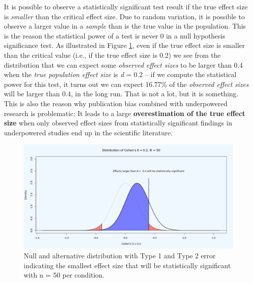 \documentclass[
  oneside]{book}
\begin{document}
It is possible to observe a statistically significant test result if the true effect size is \emph{smaller} than the critical effect size. Due to random variation, it is possible to observe a larger value in a \emph{sample} than is the true value in the population. This is the reason the statistical power of a test is never 0 in a null hypothesis significance test. As illustrated in Figure \ref{fig:distpowerplot2}, even if the true effect size is smaller than the critical value (i.e., if the true effect size is 0.2) we see from the distribution that we can expect some \emph{observed effect sizes} to be larger than 0.4 when the \emph{true population effect size} is \emph{d} = 0.2 -- if we compute the statistical power for this test, it turns out we can expect 16.77\% of the \emph{observed effect sizes} will be larger than 0.4, in the long run. That is not a lot, but it is something. This is also the reason why publication bias combined with underpowered research is problematic: It leads to a large \textbf{overestimation of the true effect size} when only observed effect sizes from statistically significant findings in underpowered studies end up in the scientific literature.



\begin{figure}

{\centering \includegraphics[width=1\linewidth]{images/dpplot502} 

}

\caption{Null and alternative distribution with Type 1 and Type 2 error indicating the smallest effect size that will be statistically significant with n = 50 per condition.}\label{fig:distpowerplot2}
\end{figure}
\end{document}
